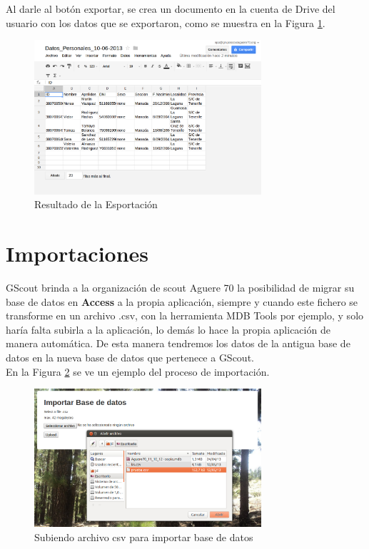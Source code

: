 Al darle al botón exportar, se crea un documento en la cuenta de Drive del usuario con los datos que se exportaron, como se muestra en la Figura \ref{fig:export_drive}.\\

\begin{figure}[H]
\begin{center}
\includegraphics[width=0.75\textwidth]{images/result_export.jpg}
\caption{Resultado de la Esportación}
\label{fig:export_drive}
\end{center}
\end{figure}

\section{Importaciones}
\label{3:sec7}

GScout brinda a la organización de scout Aguere 70 la posibilidad de migrar su base de datos en \textbf{Access} a la propia aplicación, siempre y cuando este fichero se transforme en un archivo .csv, con la herramienta MDB Tools por ejemplo,
y solo haría falta subirla a la aplicación, lo demás lo hace la propia aplicación de manera automática. De esta manera tendremos los datos de la antigua base de datos en la nueva base de datos que pertenece a GScout.\\

En la Figura \ref{fig:import} se ve un ejemplo del proceso de importación.\\ 
\begin{figure}[H]
\begin{center}
\includegraphics[width=0.75\textwidth]{images/import_db.jpg}
\caption{Subiendo archivo csv para importar base de datos}
\label{fig:import}
\end{center}
\end{figure}


